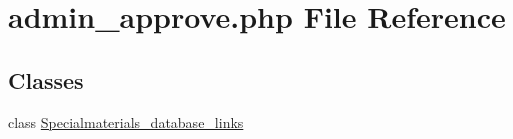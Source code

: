 \hypertarget{admin__approve_8php}{\section{admin\+\_\+approve.\+php File Reference}
\label{admin__approve_8php}
}
\subsection*{Classes}
\begin{DoxyCompactItemize}
\item 
class \hyperlink{classSpecialmaterials__database__links}{Specialmaterials\+\_\+database\+\_\+links}
\end{DoxyCompactItemize}

